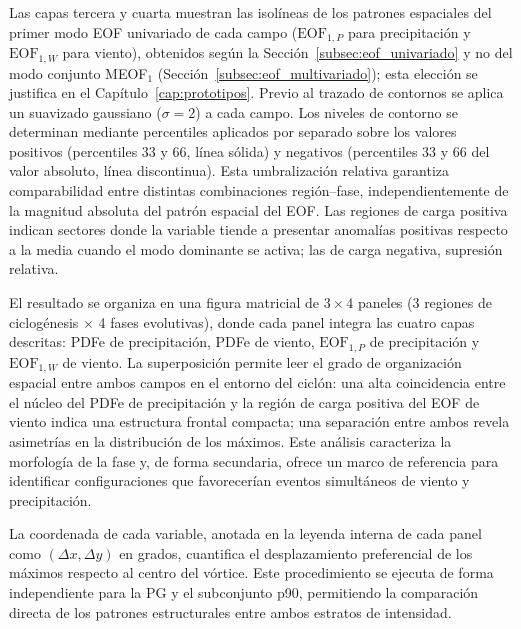 Las capas tercera y cuarta muestran las isolíneas de los patrones espaciales del primer modo EOF univariado de cada campo ($\text{EOF}_{1,P}$ para precipitación y $\text{EOF}_{1,W}$ para viento), obtenidos según la Sección~\ref{subsec:eof_univariado} y no del modo conjunto MEOF$_1$ (Sección~\ref{subsec:eof_multivariado}); esta elección se justifica en el Capítulo~\ref{cap:prototipos}.
Previo al trazado de contornos se aplica un suavizado gaussiano ($\sigma = 2$) a cada campo. Los niveles de contorno se determinan mediante percentiles aplicados por separado sobre los valores positivos (percentiles 33 y 66, línea sólida) y negativos (percentiles 33 y 66 del valor absoluto, línea discontinua).
Esta umbralización relativa garantiza comparabilidad entre distintas combinaciones región--fase, independientemente de la magnitud absoluta del patrón espacial del EOF.
Las regiones de carga positiva indican sectores donde la variable tiende a presentar anomalías positivas respecto a la media cuando el modo dominante se activa; las de carga negativa, supresión relativa.

El resultado se organiza en una figura matricial de $3 \times 4$ paneles (3 regiones de ciclogénesis $\times$ 4 fases evolutivas), donde cada panel integra las cuatro capas descritas: PDFe de precipitación, PDFe de viento, $\text{EOF}_{1,P}$ de precipitación y $\text{EOF}_{1,W}$ de viento.
La superposición permite leer el grado de organización espacial entre ambos campos en el entorno del ciclón: una alta coincidencia entre el núcleo del PDFe de precipitación y la región de carga positiva del EOF de viento indica una estructura frontal compacta; una separación entre ambos revela asimetrías en la distribución de los máximos.
Este análisis caracteriza la morfología de la fase y, de forma secundaria, ofrece un marco de referencia para identificar configuraciones que favorecerían eventos simultáneos de viento y precipitación.

La coordenada de cada variable, anotada en la leyenda interna de cada panel como $(\Delta x, \Delta y)$ en grados, cuantifica el desplazamiento preferencial de los máximos respecto al centro del vórtice. 
Este procedimiento se ejecuta de forma independiente para la PG y el subconjunto p90, permitiendo la comparación directa de los patrones estructurales entre ambos estratos de intensidad.
